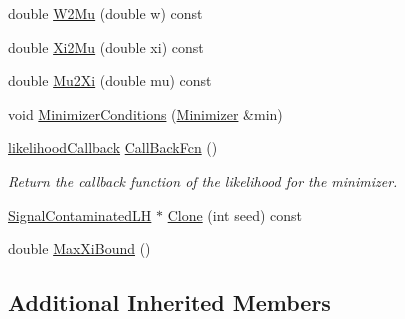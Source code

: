 \begin{DoxyCompactItemize}
\item 
double \hyperlink{classSignalContaminatedLH_a72c6b5f9c339214cbd8e3fe41c9bad5d}{W2\-Mu} (double w) const 
\item 
double \hyperlink{classSignalContaminatedLH_a7fa94978c4da27077a38818e3baf0e19}{Xi2\-Mu} (double xi) const 
\item 
double \hyperlink{classSignalContaminatedLH_a151bf309a577282e09dbb75566c1467e}{Mu2\-Xi} (double mu) const 
\item 
void \hyperlink{classSignalContaminatedLH_ad991e7649ed72c411830cb0c7788dff4}{Minimizer\-Conditions} (\hyperlink{classMinimizer}{Minimizer} \&min)
\item 
\hyperlink{Likelihood_8h_a97d92c5c141f28319e7e8198defc9084}{likelihood\-Callback} \hyperlink{classSignalContaminatedLH_a9c67422f6e79df2352bd158be9949feb}{Call\-Back\-Fcn} ()
\begin{DoxyCompactList}\small\item\em Return the callback function of the likelihood for the minimizer. \end{DoxyCompactList}\item 
\hyperlink{classSignalContaminatedLH}{Signal\-Contaminated\-L\-H} $\ast$ \hyperlink{classSignalContaminatedLH_ae7c8264a79340a12dd4a83d83f0b9d2f}{Clone} (int seed) const 
\item 
double \hyperlink{classSignalContaminatedLH_a579d86a266c6ecb44cff26e47d141a9e}{Max\-Xi\-Bound} ()
\end{DoxyCompactItemize}
\subsection*{Additional Inherited Members}


